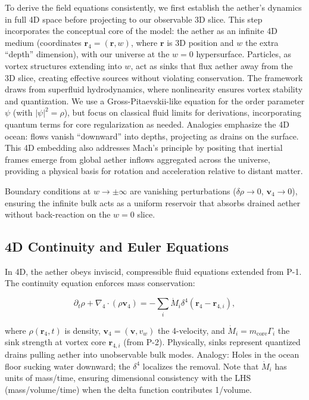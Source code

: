 \documentclass{article}
\begin{document}
To derive the field equations consistently, we first establish the aether's dynamics in full 4D space before projecting to our observable 3D slice. This step incorporates the conceptual core of the model: the aether as an infinite 4D medium (coordinates $\mathbf{r}_4 = (\mathbf{r}, w)$, where $\mathbf{r}$ is 3D position and $w$ the extra ``depth'' dimension), with our universe at the $w=0$ hypersurface. Particles, as vortex structures extending into $w$, act as sinks that flux aether away from the 3D slice, creating effective sources without violating conservation. The framework draws from superfluid hydrodynamics, where nonlinearity ensures vortex stability and quantization. We use a Gross-Pitaevskii-like equation for the order parameter $\psi$ (with $|\psi|^2 = \rho$), but focus on classical fluid limits for derivations, incorporating quantum terms for core regularization as needed. Analogies emphasize the 4D ocean: flows vanish ``downward'' into depths, projecting as drains on the surface. This 4D embedding also addresses Mach's principle by positing that inertial frames emerge from global aether inflows aggregated across the universe, providing a physical basis for rotation and acceleration relative to distant matter.

Boundary conditions at $w \to \pm \infty$ are vanishing perturbations ($\delta \rho \to 0$, $\mathbf{v}_4 \to 0$), ensuring the infinite bulk acts as a uniform reservoir that absorbs drained aether without back-reaction on the $w=0$ slice.

\subsection{4D Continuity and Euler Equations}

In 4D, the aether obeys inviscid, compressible fluid equations extended from P-1. The continuity equation enforces mass conservation:

\[
\partial_t \rho + \nabla_4 \cdot (\rho \mathbf{v}_4) = -\sum_i \dot{M}_i \delta^4(\mathbf{r}_4 - \mathbf{r}_{4,i}),
\]

where $\rho(\mathbf{r}_4, t)$ is density, $\mathbf{v}_4 = (\mathbf{v}, v_w)$ the 4-velocity, and $\dot{M}_i = m_{\text{core}} \Gamma_i$ the sink strength at vortex core $\mathbf{r}_{4,i}$ (from P-2). Physically, sinks represent quantized drains pulling aether into unobservable bulk modes. Analogy: Holes in the ocean floor sucking water downward; the $\delta^4$ localizes the removal. Note that $\dot{M}_i$ has units of mass/time, ensuring dimensional consistency with the LHS (mass/volume/time) when the delta function contributes 1/volume.
\end{document}

